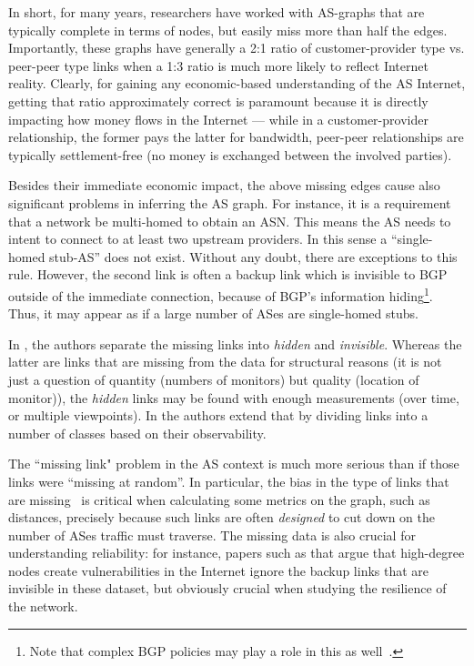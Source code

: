 In short, for many years, researchers have worked with AS-graphs that are typically complete 
in terms of nodes, but easily miss more than half the edges. Importantly, these graphs 
have generally a 2:1 ratio of customer-provider type vs. peer-peer type links when 
a 1:3 ratio is much more likely to reflect Internet reality. Clearly, for gaining 
any economic-based understanding of the AS Internet, getting that ratio approximately 
correct is paramount because it is directly impacting how money flows in the 
Internet --- while in a customer-provider relationship, the former pays the latter 
for bandwidth, peer-peer relationships are typically settlement-free (\ie no 
money is exchanged between the involved parties).  

Besides their immediate economic impact, the above missing edges cause also 
significant problems in inferring the AS graph. For instance, it is a requirement 
that a network be multi-homed to obtain an ASN. This means the AS needs to intent 
to connect to at least two upstream providers. In this sense a ``single-homed stub-AS''
does not exist.  Without any doubt, there are exceptions to this rule. However, the 
second link is often a backup link which is invisible to BGP outside of the immediate 
connection, because of BGP's information hiding\footnote{Note that complex BGP policies 
may play a role in this as well~\cite{cost_community,tim:wedgies}.}. Thus, it may 
appear as if a large number of ASes are single-homed stubs.

In \cite{oliveira10:_incompl_of_obser_inter}, the authors separate the missing 
links into {\em hidden} and {\em invisible}.  Whereas the latter are links that 
are missing from the data for structural reasons (\ie it is not just a question 
of quantity (\ie numbers of monitors) but quality (\ie location of monitor)), 
the {\em hidden} links may be found with enough measurements (over time, or 
multiple viewpoints). In \cite{roughan08:_bigfoot} the authors extend that by 
dividing links into a number of classes based on their observability.

The ``missing link" problem in the AS context is much more serious than if those 
links were ``missing at random''.  In particular, the bias in the type of links 
that are missing~\cite{roughan08:_bigfoot} is critical when calculating some 
metrics on the graph, such as distances, precisely because such links are often 
{\em designed} to cut down on the number of ASes traffic must traverse. The 
missing data is also crucial for understanding reliability: for instance, papers 
such as \cite{barabasi00} that argue that high-degree nodes create
vulnerabilities in the Internet ignore the backup links that are invisible in 
these dataset, but obviously crucial when studying the resilience of the network.

